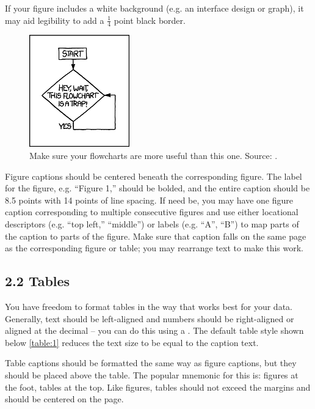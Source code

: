 {{{{If your figure includes a white background (e.g. an interface design or graph), it may aid legibility to add a $\frac{1}{4}$ point black border.

\begin{figure}[H]
  \centering
  \includegraphics[scale=0.95]{figs/example-image2}
  \caption{Make sure your flowcharts are more useful than this one. Source: .}
  \label{fig::2}
\end{figure}

Figure captions should be centered beneath the corresponding figure. The label for the figure, e.g. “Figure 1,” should be bolded, and the entire caption should be 8.5 points with 14 points of line spacing. If need be, you may have one figure caption corresponding to multiple consecutive figures and use either locational descriptors (e.g. “top left,” “middle”) or labels (e.g. “A”, “B”) to map parts of the caption to parts of the figure. Make sure that caption falls on the same page as the corresponding figure or table; you may rearrange text to make this work.

\subsection*{2.2 Tables}
You have freedom to format tables in the way that works best for your data. Generally, text should be left-aligned and numbers should be right-aligned or aligned at the decimal – you can do this using a . The default table style shown below \autoref{table:1} reduces the text size to be equal to the caption text.

Table captions should be formatted the same way as figure captions, but they should be placed above the table. The popular mnemonic for this is: figures at the foot, tables at the top. Like figures, tables should not exceed the margins and should be centered on the page.

}}}}
